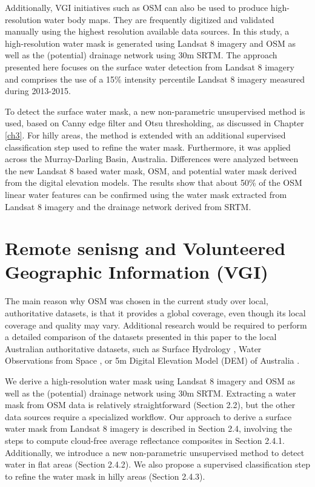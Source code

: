 Additionally, \gls{VGI} initiatives such as \gls{OSM} can also be used to produce high-resolution water body maps. They are frequently digitized and validated manually using the highest resolution available data sources. In this study, a high-resolution water mask is generated using Landsat 8 imagery and \gls{OSM} as well as the (potential) drainage network using 30m \gls{SRTM}. The approach presented here focuses on the surface water detection from Landsat 8 imagery and comprises the use of a 15\% intensity percentile Landsat 8 imagery measured during 2013-2015. 

To detect the surface water mask, a new non-parametric unsupervised method is used, based on Canny edge filter and Otsu thresholding, as discussed in Chapter \ref{ch3}. For hilly areas, the method is extended with an additional supervised classification step used to refine the water mask. Furthermore, it was applied across the Murray-Darling Basin, Australia. Differences were analyzed between the new Landsat 8 based water mask, \gls{OSM}, and potential water mask derived from the digital elevation models. The results show that about 50\% of the \gls{OSM} linear water features can be confirmed using the water mask extracted from Landsat 8 imagery and the drainage network derived from \gls{SRTM}. 

\section{Remote senisng and Volunteered Geographic Information (VGI)}
The main reason why OSM was chosen in the current study over local, authoritative datasets, is that it provides a global coverage, even though its local coverage and quality may vary. Additional research would be required to perform a detailed comparison of the datasets presented in this paper to the local Australian authoritative datasets, such as Surface Hydrology \citet{CrossmanSLi2015}, Water Observations from Space \citet{Mueller2015}, or 5m Digital Elevation Model (DEM) of Australia \citet{dataAUDEM5m}.

We derive a high-resolution water mask using Landsat 8 imagery and \gls{OSM} as well as the (potential) drainage network using 30m \gls{SRTM}. Extracting a water mask from \gls{OSM} data is relatively straightforward (Section 2.2), but the other data sources require a specialized workflow. Our approach to derive a surface water mask from Landsat 8 imagery is described in Section 2.4, involving the steps to compute cloud-free average reflectance composites in Section 2.4.1. Additionally, we introduce a new non-parametric unsupervised method to detect water in flat areas (Section 2.4.2). We also propose a supervised classification step to refine the water mask in hilly areas (Section 2.4.3). 

